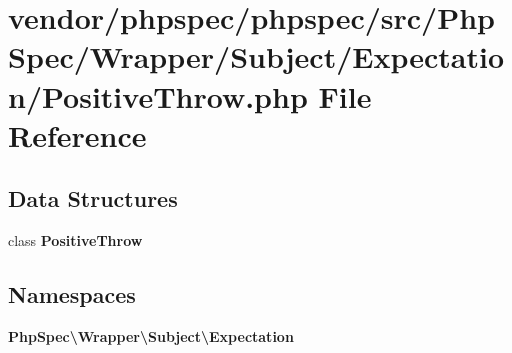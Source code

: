 \section{vendor/phpspec/phpspec/src/\+Php\+Spec/\+Wrapper/\+Subject/\+Expectation/\+Positive\+Throw.php File Reference}
\label{_positive_throw_8php}
\subsection*{Data Structures}
\begin{DoxyCompactItemize}
\item 
class {\bf Positive\+Throw}
\end{DoxyCompactItemize}
\subsection*{Namespaces}
\begin{DoxyCompactItemize}
\item 
 {\bf Php\+Spec\textbackslash{}\+Wrapper\textbackslash{}\+Subject\textbackslash{}\+Expectation}
\end{DoxyCompactItemize}
